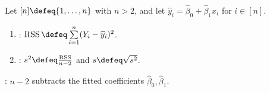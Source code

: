 \begin{definition} \label{def:simple-regression-rss-and-error-variance-estimator} \\
Let $[n]\defeq\{1,\ldots,n\}$ with $n>2$, and let $\widehat{y}_i=\widehat{\beta}_0+\widehat{\beta}_1x_i$ for $i\in[n]$.
\begin{enumerate}[label=(\roman*)]
\setlength{\itemsep}{0pt}
\item {}: $\operatorname{RSS}\defeq\sum\limits_{i=1}^{n}(Y_i-\widehat{y}_i)^2$.
\item {}: $s^2\defeq\frac{\operatorname{RSS}}{n-2}$ and $s\defeq\sqrt{s^2}$.
\end{enumerate}
: $n-2$ subtracts the fitted coefficients $\widehat{\beta}_0,\widehat{\beta}_1$.
\end{definition}

